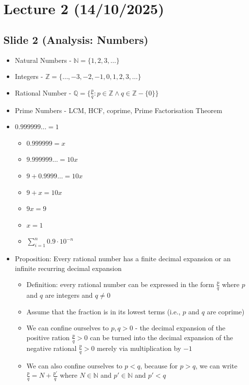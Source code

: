\documentclass{article}
\begin{document}
\section{Lecture 2 (14/10/2025)}
\subsection{Slide 2 (Analysis: Numbers)}
\begin{itemize}
    \item Natural Numbers - $\mathbb{N} = \{1,2,3,\dots\}$
    \item Integers - $\mathbb{Z} = \{\dots, -3,-2,-1,0,1,2,3,\dots \}$
    \item Rational Number - $\mathbb{Q} = \{\frac{p}{q}: p \in \mathbb{Z} \wedge q \in \mathbb{Z}-\{0\}\}$
    \item Prime Numbers - LCM, HCF, coprime, Prime Factorisation Theorem
    \item $0.999999\dots = 1$
    \begin{itemize}
        \item $0.999999 = x$
        \item $9.999999\dots = 10x$
        \item $9+0.9999\dots = 10x$
        \item $9+x = 10x$
        \item $9x=9$
        \item $x=1$
        \item $\sum_{i=1}^n 0.9 \cdot 10^{-n}$
    \end{itemize}
    \item Proposition: Every rational number has a finite decimal expansion or an infinite recurring decimal expansion
    \begin{itemize}
        \item Definition: every rational number can be expressed in the form $\frac{p}{q}$ where $p$ and $q$ are integers and $q \neq 0$
        \item Assume that the fraction is in its lowest terms (i.e., $p$ and $q$ are coprime)
        \item We can confine ourselves to $p,q>0$ - the decimal expansion of the positive ration $\frac{p}{q}>0$ can be turned into the decimal expansion of the negative rational $\frac{p}{q} >0$ merely via multiplication by $-1$
        \item We can also confine ourselves to $p<q$, because for $p>q$, we can write $\frac{p}{q} = N 
        + \frac{p'}{q}$ where $N \in \mathbb{N}$ and $p' \in \mathbb{N}$ and $p'<q$

\end{itemize}
\end{itemize}
\end{document}
